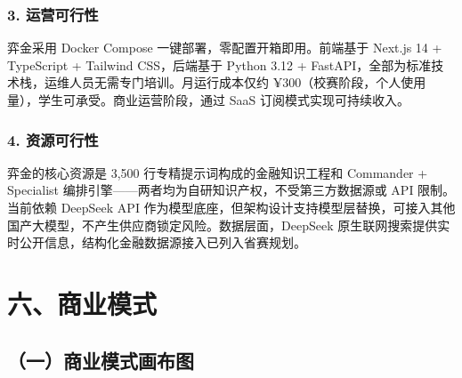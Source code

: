 \documentclass[
]{ctexart}
\begin{document}
\subsubsection{3. 运营可行性}\label{ux8fd0ux8425ux53efux884cux6027}

弈金采用 Docker Compose 一键部署，零配置开箱即用。前端基于 Next.js 14 +
TypeScript + Tailwind CSS，后端基于 Python 3.12 +
FastAPI，全部为标准技术栈，运维人员无需专门培训。月运行成本仅约
¥300（校赛阶段，个人使用量），学生可承受。商业运营阶段，通过 SaaS
订阅模式实现可持续收入。

\subsubsection{4. 资源可行性}\label{ux8d44ux6e90ux53efux884cux6027}

弈金的核心资源是 3,500 行专精提示词构成的金融知识工程和 Commander +
Specialist 编排引擎------两者均为自研知识产权，不受第三方数据源或 API
限制。当前依赖 DeepSeek API
作为模型底座，但架构设计支持模型层替换，可接入其他国产大模型，不产生供应商锁定风险。数据层面，DeepSeek
原生联网搜索提供实时公开信息，结构化金融数据源接入已列入省赛规划。

\section{六、商业模式}\label{ux516dux5546ux4e1aux6a21ux5f0f}

\subsection{（一）商业模式画布图}\label{ux4e00ux5546ux4e1aux6a21ux5f0fux753bux5e03ux56fe}
\end{document}
